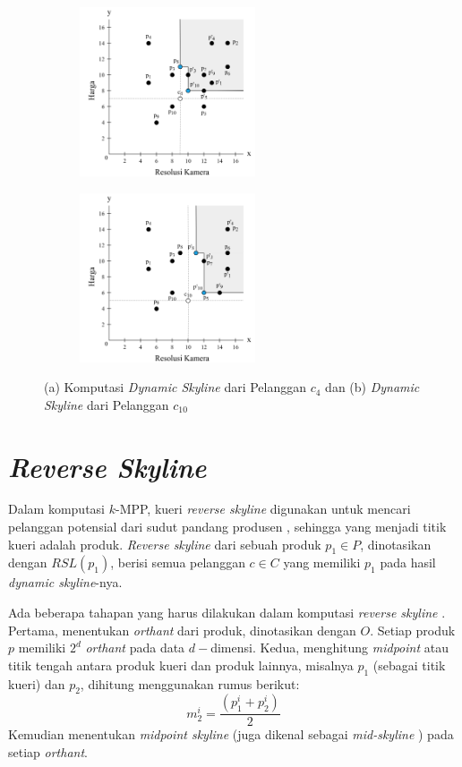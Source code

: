 \begin{figure}[h]
	\centering
	\begin{subfigure}{.5\textwidth}
		\centering
		\includegraphics[height=5cm]{bab2/img/dsl-1.png}
		\caption{}
	\end{subfigure}%
	\begin{subfigure}{.5\textwidth}
		\centering
		\includegraphics[height=5cm]{bab2/img/dsl-2.png}
		\caption{}
	\end{subfigure}
	\caption{(a) Komputasi \textit{Dynamic Skyline} dari Pelanggan $c_{4}$ dan (b) \textit{Dynamic Skyline} dari Pelanggan $c_{10}$}
	\label{fig:dsl}
\end{figure}

\section{\textit{Reverse Skyline}}
\tab Dalam komputasi $k$-MPP, kueri \textit{reverse skyline} digunakan untuk mencari pelanggan potensial dari sudut pandang produsen \cite{kmpp}, sehingga yang menjadi titik kueri adalah produk. \textit{Reverse skyline} \cite{reverse-skyline} dari sebuah produk $p_1 \in
P$, dinotasikan dengan $RSL(p_1)$, berisi semua pelanggan $c \in C$ yang memiliki $p_1$ pada hasil \textit{dynamic skyline}-nya.

Ada beberapa tahapan yang harus dilakukan dalam komputasi \textit{reverse skyline} \cite{kmpp}. Pertama, menentukan \textit{orthant} dari produk, dinotasikan dengan $O$. Setiap produk $p$ memiliki $2^d$ \textit{orthant} pada data $d-$dimensi. Kedua, menghitung \textit{midpoint} atau titik tengah antara produk kueri dan produk lainnya, misalnya $p_1$ (sebagai titik kueri) dan $p_2$, dihitung menggunakan rumus berikut: 
\begin{equation} \label{eq:midpoint}
m_2^i = \frac{(p_1^i + p_2^i)}{2}
\end{equation}
Kemudian menentukan \textit{midpoint skyline} (juga dikenal sebagai \textit{mid-skyline} \cite{mid-skyline}) pada setiap \textit{orthant}.

